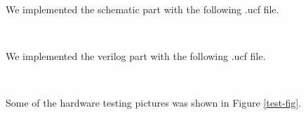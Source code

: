 \documentclass{article}
\begin{document}
We implemented the schematic part with the following .ucf file.\\

\begin{minipage}{0.2\linewidth}\end{minipage}
\begin{minipage}{0.7\linewidth}
\inputminted{c}{../lab4/counter.ucf}
\end{minipage}
\ \\

We implemented the verilog part with the following .ucf file.\\

\begin{minipage}{0.2\linewidth}\end{minipage}
\begin{minipage}{0.7\linewidth}
\inputminted{c}{../lab4/counter_verilog.ucf}
\end{minipage}
\ \\

Some of the hardware testing pictures was shown in Figure \ref{test-fig}.
\end{document}
